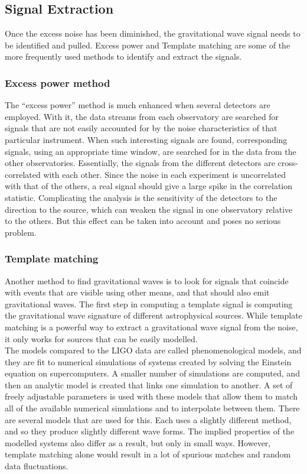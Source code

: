 \subsection{Signal Extraction}
Once the excess noise has been diminished, the gravitational wave signal needs to be identified and pulled. Excess power and Template matching are some of the more frequently used methods to identify and extract the signals.

\subsubsection*{Excess power method}

The “excess power” method is much enhanced when several detectors are employed. With it, the data streams from each observatory are searched for signals that are not easily accounted for by the noise characteristics of that particular instrument. When such interesting signals are found, corresponding signals, using an appropriate time window, are searched for in the data from the other observatories. Essentially, the signals from the different detectors are cross-correlated with each other. Since the noise in each experiment is uncorrelated with that of the others, a real signal should give a large spike in the correlation statistic. Complicating the analysis is the sensitivity of the detectors to the direction to the source, which can weaken the signal in one observatory relative to the others. But this effect can be taken into account and poses no serious problem.

\subsubsection*{Template matching}

Another method to find gravitational waves is to look for signals that coincide with events that are visible using other means, and that should also emit gravitational waves. The first step in computing a template signal is computing the gravitational wave signature of different astrophysical sources. While template matching is a powerful way to extract a gravitational wave signal from the noise, it only works for sources that can be easily modelled. \\

The models compared to the LIGO data are called phenomenological models, and they are fit to numerical simulations of systems created by solving the Einstein equation on supercomputers. A smaller number of simulations are computed, and then an analytic model is created that links one simulation to another. A set of freely adjustable parameters is used with these models that allow them to match all of the available numerical simulations and to interpolate between them. There are several models that are used for this. Each uses a slightly different method, and so they produce slightly different wave forms. The implied properties of the modelled systems also differ as a result, but only in small ways. However, template matching alone would result in a lot of spurious matches and random data fluctuations.

